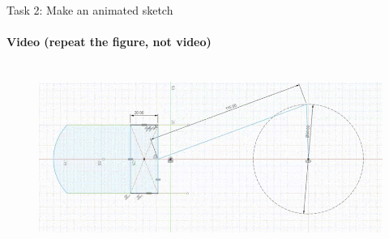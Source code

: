 \documentclass[aspectratio=169]{beamer}
\begin{document}
\begin{frame}[t]{Task 2: Make an animated sketch}
    \framesubtitle{Video (repeat the figure, not video)}
    \vspace{-0.6cm}
    \begin{figure}[H]
        \href{https://youtu.be/KohY2-krw1I}{
            \centering\includegraphics[height=6cm,width=1\textwidth,keepaspectratio]{resources/task_2.png}}
        \label{fig:task_2.png}
    \end{figure}
\end{frame}
\end{document}
